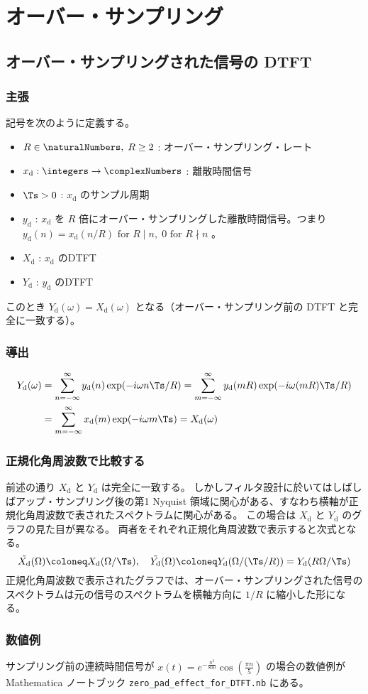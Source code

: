\chapter{オーバー・サンプリング}
    \section{オーバー・サンプリングされた信号の DTFT}
        \label{オーバー・サンプリングされた信号の DTFT}
        \newcommand{\xd}{x_\text{d}}
        \newcommand{\yd}{y_\text{d}}
        \newcommand{\Xd}{X_\text{d}}
        \newcommand{\Yd}{Y_\text{d}}
        \subsection{主張}
            記号を次のように定義する。
            \begin{itemize}
                \item $R\in\naturalNumbers,\;R\geq 2$ : オーバー・サンプリング・レート
                \item $\xd:\integers\to\complexNumbers$ : 離散時間信号
                \item $\Ts>0$ : $\xd$ のサンプル周期
                \item $\yd$ : $\xd$ を $R$ 倍にオーバー・サンプリングした離散時間信号。つまり $\yd(n) = \xd(n/R)\text{ for }R\mid n,\;0\text{ for }R\nmid n$ 。
                \item $\Xd$ : $\xd$ のDTFT
                \item $\Yd$ : $\yd$ のDTFT
            \end{itemize}
            このとき $\Yd(\omega) = \Xd(\omega)$ となる（オーバー・サンプリング前の DTFT と完全に一致する）。
        \subsection{導出}
            \begin{align*}
                \Yd(\omega) &= \sum_{n=-\infty}^\infty \yd(n)\exp(-i\omega n\Ts/R) = \sum_{m=-\infty}^\infty \yd(mR)\exp(-i\omega (mR)\Ts/R) \\
                &= \sum_{m=-\infty}^\infty \xd(m)\exp(-i\omega m\Ts) = \Xd(\omega)
            \end{align*}
        \subsection{正規化角周波数で比較する}
            前述の通り $\Xd$ と $\Yd$ は完全に一致する。
            しかしフィルタ設計に於いてはしばしばアップ・サンプリング後の第1 Nyquist 領域に関心がある、すなわち横軸が正規化角周波数で表されたスペクトラムに関心がある。
            この場合は $\Xd$ と $\Yd$ のグラフの見た目が異なる。
            両者をそれぞれ正規化角周波数で表示すると次式となる。
            \[ \tilde{\Xd}(\Omega) \coloneq \Xd(\Omega/\Ts),\quad \tilde{\Yd}(\Omega) \coloneq \Yd(\Omega/(\Ts/R)) = \Yd(R\Omega/\Ts) \]
            正規化角周波数で表示されたグラフでは、オーバー・サンプリングされた信号のスペクトラムは元の信号のスペクトラムを横軸方向に $1/R$ に縮小した形になる。
        \subsection{数値例}
            サンプリング前の連続時間信号が $x(t) = e^{-\frac{n^2}{800}}\cos\left(\frac{\pi n}{5}\right)$ の場合の数値例が Mathematica ノートブック \verb|zero_pad_effect_for_DTFT.nb| にある。

